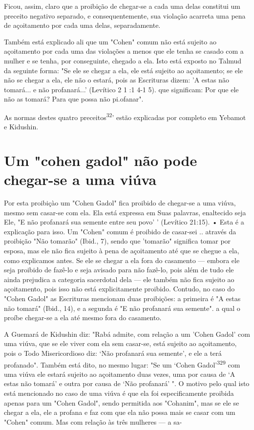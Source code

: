 \begin{itemize}
\begin{enumrate}
\begin{itemize}
\begin{itemize}
\begin{itemize}
Ficou, assim, claro que a proibição de chegar-se a cada uma delas
constitui um preceito negativo separado, e consequentemente, sua
violação acar­reta uma pena de açoitamento por cada uma delas,
separadamente.

Também está explicado ali que um "Cohen" comum não está sujei­to ao
açoitamento por cada uma das violações a menos que ele tenha se casado
com a mulher e se tenha, por conseguinte, chegado a ela. Isto está
exposto no Talmud da seguinte forma: "Se ele se chegar a ela, ele está
sujeito ao açoita­mento; se ele não se chegar a ela, ele não o estará,
pois as Escrituras dizem: 'A estas não tomará... e não profanará...'
(Levítico 2 1 :1 4-1 5). que significam: Por que ele não as tomará? Para
que possa não pi.ofanar".

As normas destes quatro preceitos\textsuperscript{32}' estão explicadas
por comple­to em Yebamot e Kidushin.

\section{Um "cohen gadol" não pode chegar-se a uma viúva}

Por esta proibiçào um "Cohen Gadol" fica proibido de chegar-se a uma
viúva, mesmo sem casar-se com ela. Ela está expressa em Suas palavras,
enal­tecido seja Ele, "E não profanará sua semente entre seu povo' '
(Levítico 21:15). • Esta é a explicação para isso. Um "Cohen" comum é
proibido de casar-sei .. através da proibição "Não
tomarão" (Ibid., 7), sendo que 'tomarão" sig­nifica tomar por esposa,
mas ele não fica sujeito à pena de açoitamento até que se chegue a ela,
como explicamos antes. Se ele se chegar a ela fora do casamento ---
embora ele seja proibido de fazê-lo e seja avisado para não fazê-lo,
pois além de tudo ele ainda prejudica a categoria sacerdotal dela ---
ele também não fica sujeito ao açoitamento, pois isso não está
explicitamente proibido. Contudo, no caso do "Cohen Gadol" as Escrituras
mencionam duas proibições: a primei­ra é "A estas não tomará" (Ibid.,
14), e a segunda é "E não profanará sua semen­te". a qual o proíbe
chegar-se a ela até mesmo fora do casamento.

A Guemará de Kidushin diz: "Rabá admite, com relação a um 'Co­hen Gadol'
com uma viúva, que se ele viver com ela sem casar-se, está sujeito ao
açoitamento, pois o Todo Misericordioso diz: `Não profanará sua
semente', e ele a terá profanado". Também está dito, no mesmo lugar: "Se
um `Cohen Gadol'\textsuperscript{329} com uma viúva ele estará sujeito
ao açoitamento duas vezes, uma por causa de `A estas não tomará' e outra
por causa de `Não profanará' ". O motivo pelo qual isto está mencionado
no caso de uma viúva é que ela foi especifica­mente proibida apenas para
um "Cohen Gadol", sendo permitida aos "Coha­nim", mas se ele se chegar a
ela, ele a profana e faz com que ela não possa mais se casar com um
"Cohen" comum. Mas com relação às três mulheres --- a sa-


\end{itemize}
\end{itemize}
\end{itemize}
\end{enumrate}
\end{itemize}
